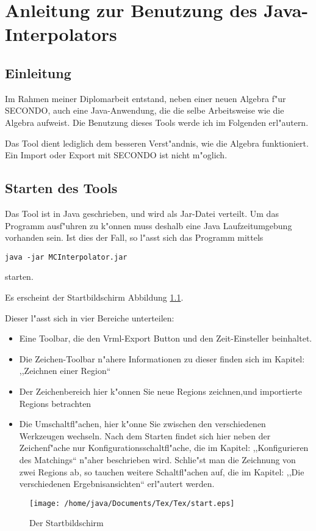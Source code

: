 
\chapter{Anleitung zur Benutzung des Java-Interpolators}
\minitoc
\newpage
\section{Einleitung}
Im Rahmen meiner Diplomarbeit entstand, neben einer neuen Algebra f"ur SECONDO, auch eine Java-Anwendung, die die selbe Arbeitsweise wie die Algebra aufweist. Die Benutzung dieses Tools werde ich im Folgenden erl"autern.

Das Tool dient lediglich dem besseren Verst"andnis, wie die Algebra funktioniert. Ein Import oder Export mit SECONDO ist nicht m"oglich.
\section{Starten des Tools}
Das Tool ist in Java geschrieben, und wird als Jar-Datei verteilt. Um das Programm ausf"uhren zu k"onnen muss deshalb eine Java Laufzeitumgebung vorhanden sein. Ist dies der Fall, so l"asst sich das Programm mittels \begin{verbatim}
java -jar MCInterpolator.jar
\end{verbatim}  starten.

Es erscheint der Startbildschirm Abbildung \ref{fig:start}.

Dieser l"asst sich in vier Bereiche unterteilen:
\begin{itemize}
\item Eine Toolbar, die den Vrml-Export Button und den Zeit-Einsteller beinhaltet. 
\item Die Zeichen-Toolbar n"ahere Informationen zu dieser finden sich im Kapitel: ,,Zeichnen einer Region``
\item Der Zeichenbereich hier k"onnen Sie neue Regions zeichnen,und importierte Regions betrachten
\item Die Umschaltfl"achen, hier k"onne Sie zwischen den verschiedenen Werkzeugen wechseln. Nach dem Starten findet sich hier neben der Zeichenf"ache nur Konfigurationsschaltfl"ache, die im Kapitel: ,,Konfigurieren des Matchings`` n"aher beschrieben wird. Schlie"st man die Zeichnung von zwei Regions ab, so tauchen weitere Schaltfl"achen auf, die im Kapitel: ,,Die verschiedenen Ergebnisansichten`` erl"autert werden.
\end{itemize} 
\begin{figure}
   \centering
   \texttt{[image: /home/java/Documents/Tex/Tex/start.eps]}
   \caption{Der Startbildschirm}
   \label{fig:start}
\end{figure}

